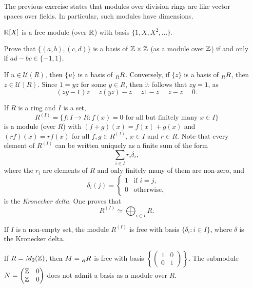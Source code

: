 The previous exercise states that modules over division rings 
are like vector spaces over fields. In particular, 
such modules have dimensions.

\begin{example}
    $\mathbb{R}[X]$ is a free module (over $\mathbb{R}$) with basis $\{1,X,X^2,\dots\}$. 
\end{example}

\begin{exercise}
    Prove that $\{(a,b),(c,d)\}$ is a basis of $\mathbb{Z}\times\mathbb{Z}$ 
    (as a module over $\mathbb{Z}$) if and only if
    $ad-bc\in\{-1,1\}$. 
\end{exercise}

\begin{example}
If $u\in\mathcal{U}(R)$, then $\{u\}$ is a basis of $\prescript{}{R}R$.
Conversely, 
if $\{z\}$ is a basis of $\prescript{}{R}R$, then $z\in\mathcal{U}(R)$. Since
$1=yz$ for some $y\in R$, then it follows that $zy=1$, as  
\[
(zy-1)z=z(yz)-z=z1-z=z-z=0.
\]	
\end{example}

If $R$ is a ring and $I$ is a set, 
\[
R^{(I)}=\{f\colon I\to R:f(x)=0\text{ for all but finitely many $x\in I$}\}
\]
is a module (over $R$) with 
$(f+g)(x)=f(x)+g(x)$ and $(rf)(x)=rf(x)$ for all $f,g\in R^{(I)}$, $x\in I$ and
$r\in R$. 
Note that 
every element 
of $R^{(I)}$ can be written uniquely as
a finite sum of the form 
\[
\sum_{i\in I}r_i\delta_i,
\]
where the $r_i$ are elements of $R$ and only finitely many of them are non-zero, and 
\[
\delta_i(j)=\begin{cases}
1 & \text{if $i=j$},\\
0 & \text{otherwise},
\end{cases}
\]
is the \emph{Kronecker delta}. 
One proves
that
\[
R^{(I)}\simeq\bigoplus_{i\in I}R.
\]

\begin{example}
If $I$ is a non-empty set, the module $R^{(I)}$ is free with basis 
$\{\delta_i:i\in I\}$, where $\delta$ is the Kronecker delta. 
\end{example}

\begin{example}
If $R=M_2(\mathbb{Z})$, then $M=\prescript{}{R}R$ is free with basis $\left\{\begin{pmatrix}
    1&0\\0&1\end{pmatrix}\right\}$. The submodule 
$N=\begin{pmatrix}\mathbb{Z}&0\\\mathbb{Z}&0\end{pmatrix}$ does not admit a basis as a module over $R$.
\end{example}

